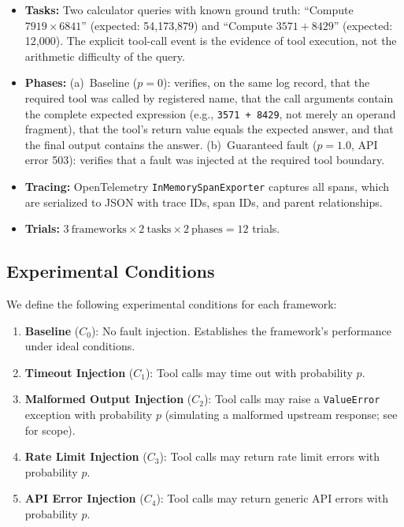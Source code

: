 \documentclass[make,article,submit,moreauthors,pdftex]{mdpi}
\begin{document}
\begin{itemize}
  \item \textbf{Tasks:} Two calculator queries with known ground truth: ``Compute $7919 \times 6841$'' (expected: 54{,}173{,}879) and ``Compute $3571 + 8429$'' (expected: 12{,}000). The explicit tool-call event is the evidence of tool execution, not the arithmetic difficulty of the query.
  \item \textbf{Phases:} (a)~Baseline ($p = 0$): verifies, on the same log record, that the required tool was called by registered name, that the call arguments contain the complete expected expression (e.g., \texttt{3571 + 8429}, not merely an operand fragment), that the tool's return value equals the expected answer, and that the final output contains the answer. (b)~Guaranteed fault ($p = 1.0$, API error 503): verifies that a fault was injected at the required tool boundary.
  \item \textbf{Tracing:} OpenTelemetry \texttt{InMemorySpanExporter} captures all spans, which are serialized to JSON with trace IDs, span IDs, and parent relationships.
  \item \textbf{Trials:} $3~\text{frameworks} \times 2~\text{tasks} \times 2~\text{phases} = 12$ trials.
\end{itemize}

\subsection{Experimental Conditions}

We define the following experimental conditions for each framework:

\begin{enumerate}
  \item \textbf{Baseline} ($C_0$): No fault injection. Establishes the framework's performance under ideal conditions.
  \item \textbf{Timeout Injection} ($C_1$): Tool calls may time out with probability $p$.
  \item \textbf{Malformed Output Injection} ($C_2$): Tool calls may raise a \texttt{ValueError} exception with probability $p$ (simulating a malformed upstream response; see  for scope).
  \item \textbf{Rate Limit Injection} ($C_3$): Tool calls may return rate limit errors with probability $p$.
  \item \textbf{API Error Injection} ($C_4$): Tool calls may return generic API errors with probability $p$.
\end{enumerate}
\end{document}
